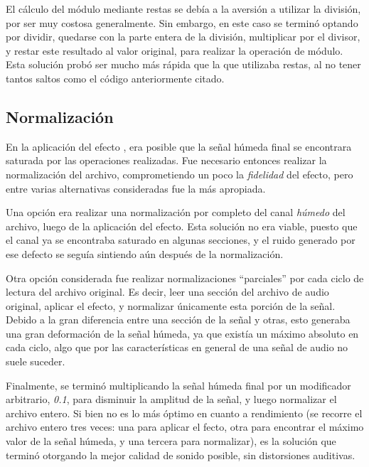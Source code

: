 El cálculo del módulo mediante restas se debía a la aversión a utilizar la división, por ser muy costosa generalmente. Sin embargo, en este caso se terminó optando por dividir, quedarse con la parte entera de la división, multiplicar por el divisor, y restar este resultado al valor original, para realizar la operación de módulo. Esta solución probó ser mucho más rápida que la que utilizaba restas, al no tener tantos saltos como el código anteriormente citado.

\subsection{Normalización}
\label{subsec:desarrollo-problemas-normalizacion}

En la aplicación del efecto , era posible que la señal húmeda final se encontrara saturada por las operaciones realizadas. Fue necesario entonces realizar la normalización del archivo, comprometiendo un poco la \textit{fidelidad} del efecto, pero entre varias alternativas consideradas fue la más apropiada.

Una opción era realizar una normalización por completo del canal \textit{húmedo} del archivo, luego de la aplicación del efecto. Esta solución no era viable, puesto que el canal ya se encontraba saturado en algunas secciones, y el ruido generado por ese defecto se seguía sintiendo aún después de la normalización.

Otra opción considerada fue realizar normalizaciones ``parciales'' por cada ciclo de lectura del archivo original. Es decir, leer una sección del archivo de audio original, aplicar el efecto, y normalizar únicamente esta porción de la señal. Debido a la gran diferencia entre una sección de la señal y otras, esto generaba una gran deformación de la señal húmeda, ya que existía un máximo absoluto en cada ciclo, algo que por las características en general de una señal de audio no suele suceder.

Finalmente, se terminó multiplicando la señal húmeda final por un modificador arbitrario, \textit{0.1}, para disminuir la amplitud de la señal, y luego normalizar el archivo entero. Si bien no es lo más óptimo en cuanto a rendimiento (se recorre el archivo entero tres veces: una para aplicar el fecto, otra para encontrar el máximo valor de la señal húmeda, y una tercera para normalizar), es la solución que terminó otorgando la mejor calidad de sonido posible, sin distorsiones auditivas.
